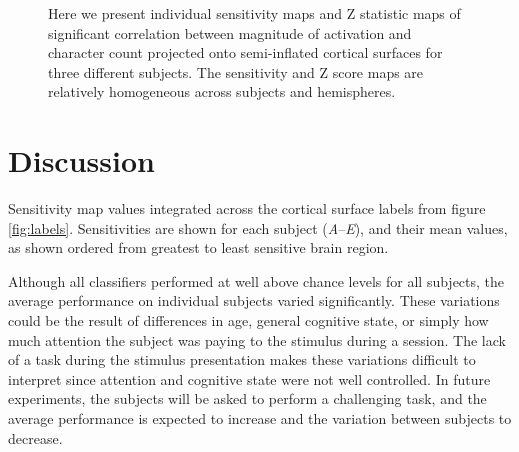 \documentclass[5p,authoryear]{elsarticle}
\begin{document}
\begin{figure}

\caption{Here we present individual sensitivity maps and Z statistic maps of significant correlation between magnitude of activation and character count projected onto semi-inflated cortical surfaces for three different subjects.
The sensitivity and Z score maps are relatively homogeneous across subjects and hemispheres.}
\label{fig:individual-sensitivity}
\end{figure}

\section{Discussion}

\begin{table}
\centering

\caption{Sensitivity map values integrated across the cortical surface labels from figure \ref{fig:labels}. Sensitivities are shown for each subject (\emph{A}--\emph{E}), and their mean values, as shown ordered from greatest to least sensitive brain region.}
\label{tab:full-sensitivity}
\end{table}

Although all classifiers performed at well above chance levels for all subjects, the average performance on individual subjects varied significantly.
These variations could be the result of differences in age, general cognitive state, or simply how much attention the subject was paying to the stimulus during a session.
The lack of a task during the stimulus presentation makes these variations difficult to interpret since attention and cognitive state were not well controlled.
In future experiments, the subjects will be asked to perform a challenging task, and the average performance is expected to increase and the variation between subjects to decrease.
\end{document}
